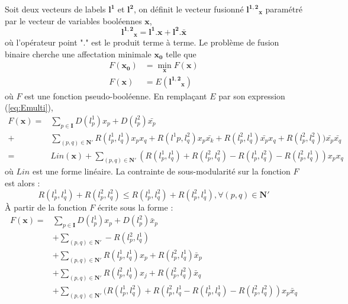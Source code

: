 \documentclass[../main/These_Mathias_Paget.tex]{subfiles}
\begin{document}
	Soit deux vecteurs de labels $\boldsymbol{l^1}$ et $\boldsymbol{l^2}$, on définit le vecteur fusionné $\boldsymbol{l^{1,2}}_{\boldsymbol{x}}$ paramétré par le vecteur de variables booléennes $\boldsymbol{x}$,
	\begin{equation}
		\boldsymbol{l^{1,2}}_{\boldsymbol{x}} = \boldsymbol{l^1}.\boldsymbol{x} + \boldsymbol{l^2}.\boldsymbol{\bar{x}}
	\end{equation}
	où l'opérateur point "$.$" est le produit terme à terme. Le problème de fusion binaire cherche une affectation minimale $\boldsymbol{x_0}$ telle que 
	\begin{equation}
		\begin{aligned}
		F(\boldsymbol{x_0}) &= \min_{\boldsymbol{x}}{F(\boldsymbol{x})} \\
		F(\boldsymbol{x}) &=E(\boldsymbol{l^{1,2}}_{\boldsymbol{x}})
		\end{aligned}
	\end{equation}
où $F$ est une fonction pseudo-booléenne. En remplaçant $E$ par son expression (\ref{eq:Emulti}),
	\begin{equation}
	\begin{aligned}
	F(\boldsymbol{x}) =& \sum_{p \in \boldsymbol{I}}{ D(l^{1}_p)x_p + D(l^{2}_p)\bar{x_p}}  \\ 
	+& \sum_{(p,q) \in \boldsymbol{N'}}{ R(l^{1}_p,l^{1}_q)x_px_q  + R(l^{1}p,l^{2}_q)x_p\bar{x_k} + R(l^{2}_p,l^{1}_q)\bar{x_p}x_q + R(l^{2}_p,l^{2}_q))\bar{x_p}\bar{x_q}} \\
	=& {Lin}(\boldsymbol{x}) + \sum_{(p,q) \in \boldsymbol{N'}}{ (R(l^{1}_p,l^{1}_q) + R(l^{2}_p,l^{2}_q) - R(l^{1}_p,l^{2}_q) -R(l^{2}_p,l^{1}_q))x_px_q}
	\end{aligned}
	\end{equation}
	où $Lin$ est une forme linéaire. La contrainte de sous-modularité sur la fonction $F$ est alors :
	\begin{equation}
	\label{eq:sous_mod_multi}
	R(l^{1}_p,l^{1}_q) + R(l^{2}_p,l^{2}_q) \leq R(l^{1}_p,l^{2}_q) + R(l^{2}_p,l^{1}_q), \forall (p,q) \in \boldsymbol{N'}
	\end{equation}
À partir de la fonction $F$ écrite sous la forme :
	\begin{equation}
	\begin{aligned}
	F(\boldsymbol{x}) =& \sum_{p \in \boldsymbol{I}}{D(l^1_p)x_p + D(l^2_p)\bar{x}_p} \\
					  &+ \sum_{(p,q) \in \boldsymbol{N'}} -R(l^{2}_p,l^{1}_q) \\
					  &+ \sum_{(p,q) \in \boldsymbol{N'}} R(l^{1}_p,l^{1}_q)x_p +R(l^{2}_p,l^{1}_q)\bar{x}_p \\
					  &+ \sum_{(p,q) \in \boldsymbol{N'}} R(l^{2}_p,l^{1}_q)x_j +R(l^{2}_p,l^{2}_q)\bar{x}_q \\
					  &+ \sum_{(p,q) \in \boldsymbol{N'}}{(R(l^{1}_p,l^{2}_q) + R(l^{2}_p,l^{1}_q - R(l^{1}_p,l^{1}_q) - R(l^{2}_p,l^{2}_q) )x_p\bar{x}_q}
	\end{aligned}
	\end{equation}	
\end{document}
